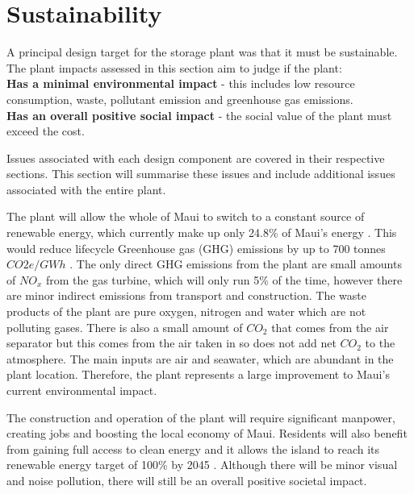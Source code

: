 


%
\section{Sustainability}

A principal design target for the storage plant was that it must be sustainable. The plant impacts assessed in this section aim to judge if the plant:
\\ \textbf{Has a minimal environmental impact} - this includes low resource consumption, waste, pollutant emission and greenhouse gas emissions.
\\ \textbf{Has an overall positive social impact} - the social value of the plant must exceed the cost.

Issues associated with each design component are covered in their respective sections. This section will summarise these issues and include additional issues associated with the entire plant.

The plant will allow the whole of Maui to switch to a constant source of renewable energy, which currently make up only 24.8\% of Maui's energy \cite{website:mauielectric}. This would reduce lifecycle Greenhouse gas (GHG) emissions by up to 700 tonnes $CO2e/GWh$ \cite{GHG}. The only direct GHG emissions from the plant are small amounts of $NO_x$ from the gas turbine, which will only run 5\% of the time, however there are minor indirect emissions from transport and construction. The waste products of the plant are pure oxygen, nitrogen and water which are not polluting gases. There is also a small amount of $CO_2$ that comes from the air separator but this comes from the air taken in so does not add net $CO_2$ to the atmosphere. The main inputs are air and seawater, which are abundant in the plant location. Therefore, the plant represents a large improvement to Maui's current environmental impact.

The construction and operation of the plant will require significant manpower, creating jobs and boosting the local economy of Maui. Residents will also benefit from gaining full access to clean energy and it allows the island to reach its renewable energy target of 100\% by 2045 \cite{website:hcei}. Although there will be minor visual and noise pollution, there will still be an overall positive societal impact.



%